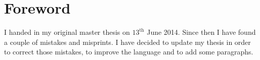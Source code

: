 \chapter*{Foreword}

I handed in my original master thesis on $13^\text{th}$ June 2014. Since then I
have found a couple of mistakes and misprints. I have decided to update my
thesis in order to correct those mistakes, to improve the language and to add
some paragraphs.
